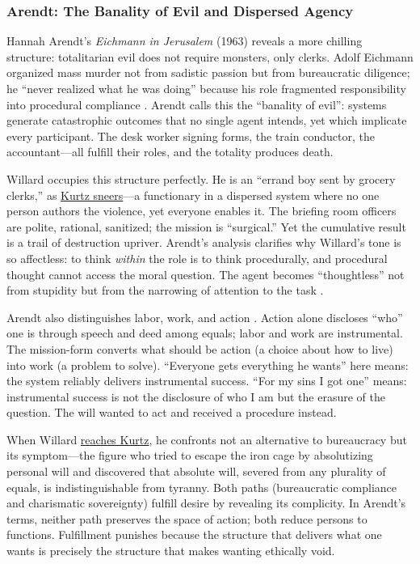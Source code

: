 \subsubsection*{Arendt: The Banality of Evil and Dispersed Agency}
Hannah Arendt's \textit{Eichmann in Jerusalem} (1963) reveals a more chilling structure:
totalitarian evil does not require monsters, only clerks. Adolf Eichmann organized mass murder
not from sadistic passion but from bureaucratic diligence; he ``never realized what he was
doing'' because his role fragmented responsibility into procedural compliance
\parencite{ArendtEichmann1963}. Arendt calls this the ``banality of evil'': systems generate
catastrophic outcomes that no single agent intends, yet which implicate every participant. The
desk worker signing forms, the train conductor, the accountant---all fulfill their roles, and
the totality produces death.

Willard occupies this structure perfectly. He is an ``errand boy sent by grocery clerks,'' as
\hyperref[scene:kurtz-compound]{Kurtz sneers}---a functionary in a dispersed system where no one
person authors the violence, yet everyone enables it. The briefing room officers are polite,
rational, sanitized; the
mission is ``surgical.'' Yet the cumulative result is a trail of destruction upriver. Arendt's
analysis clarifies why Willard's tone is so affectless: to think \emph{within} the role is to
think procedurally, and procedural thought cannot access the moral question. The agent becomes
``thoughtless'' not from stupidity but from the narrowing of attention to the task
\parencite{ArendtEichmann1963}.

Arendt also distinguishes labor, work, and action \parencite{ArendtHC1958}. Action alone
discloses ``who'' one is through speech and deed among equals; labor and work are instrumental.
The mission-form converts what should be action (a choice about how to live) into work (a
problem to solve). ``Everyone gets everything he wants'' here means: the system reliably
delivers instrumental success. ``For my sins I got one'' means: instrumental success is not the
disclosure of who I am but the erasure of the question. The will wanted to act and received a
procedure instead.

When Willard \hyperref[scene:kurtz-compound]{reaches Kurtz}, he confronts not an alternative
to bureaucracy but its symptom---the figure who tried to escape the iron cage by absolutizing
personal will and
discovered that absolute will, severed from any plurality of equals, is indistinguishable from
tyranny. Both paths (bureaucratic compliance and charismatic sovereignty) fulfill desire by
revealing its complicity. In Arendt's terms, neither path preserves the space of action; both
reduce persons to functions. Fulfillment punishes because the structure that delivers what one
wants is precisely the structure that makes wanting ethically void.
